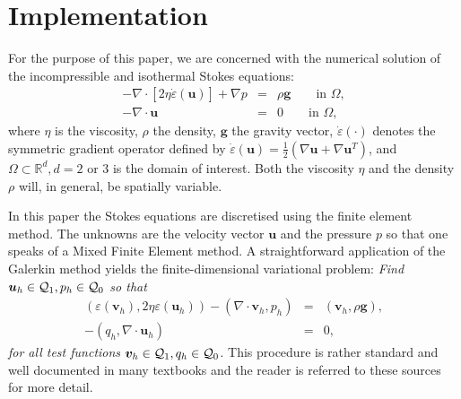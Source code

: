 \documentclass[a4paper]{article}
\begin{document}













\section{Implementation}


For the purpose of this paper, we are concerned with the numerical solution of 
the incompressible and isothermal Stokes equations:
\begin{eqnarray}
-\nabla \cdot \left[ 2\eta \dot\varepsilon({\bm u}) \right] + \nabla p &=& \rho \bm g \qquad  \textrm{in $\Omega$},
\label{eq:conv_momentum}  \\  
-\nabla \cdot {\bm u} &=& 0    \qquad    \textrm{in $\Omega$},   \label{eq:conv_mass} 
\end{eqnarray}
where $\eta$ is the viscosity, $\rho$ the density, ${\bm g}$ the gravity vector, $\dot\varepsilon(\cdot)$
denotes the symmetric gradient operator defined by $\dot\varepsilon({\bm u})
=\frac 12 (\nabla {\bm u} + \nabla {\bm u}^{T})$, 
and $\Omega\subset{\mathbb R}^d, d=2\text{ or }3$ is the domain
of interest. Both the viscosity $\eta$
and the density $\rho$ will, in general, be spatially variable.

In this paper the Stokes equations are discretised using the finite element method.
The unknowns are the velocity vector ${\bm u}$ and the pressure $p$ so that 
one speaks of a Mixed Finite Element method. 
A straightforward application of the Galerkin method yields the finite-dimensional 
variational problem: 
\textit{Find ${\bm u}_h\in {\cal Q}_1,p_h\in {\cal Q}_0$
so that
\begin{eqnarray}
\label{eq:discrete-formulation}
\left(\varepsilon(\bm v_h), 2\eta \varepsilon(\bm u_h)\right)  - ( \nabla \cdot \bm v_h, p_h) &=&   ({\bm v}_h,\rho \bm g),\\
-(q_h,\nabla \cdot \bm u_h) &=& 0,
\end{eqnarray}
for all test functions ${\bm v}_h\in {\cal Q}_1, q_h\in {\cal Q}_0$.}
This procedure is rather standard and well documented in many 
textbooks \cite{grsa,dohu03,bobf13} and the reader is referred to these sources 
for more detail.
\end{document}
